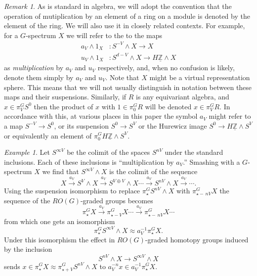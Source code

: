 \documentclass{amsart}
\newtheorem{rem}[equation]{Remark}
\theoremstyle{definition}
\theoremstyle{remark}
\newtheorem{rem}[equation]{Remark}
\newtheorem{eg}[equation]{Example}
\newcommand{\Z}{{\mathbb Z}}
\newcommand{\Zm}{\underline{\Z}}
\begin{document}
\begin{rem}
\label{rem:61} As is standard in algebra, we will adopt the convention
that the operation of mutiplication by an element of a ring on a
module is denoted by the element of the ring.  We will also use it in
closely related contexts.  For example, for a $G$-spectrum $X$ we will
refer to the to the maps
\begin{align*}
a_{V}\wedge 1_{X} &: S^{-V}\wedge X\to X \\
u_{V}\wedge 1_{X} &: S^{d-V}\wedge X\to H\Zm\wedge X
\end{align*}
as {\em multiplication} by $a_{V}$ and $u_{V}$ respectively, and, when
no confusion is likely, denote them simply by $a_{V}$ and $u_{V}$.
Note that $X$ might be a virtual representation sphere.  This means
that we will not usually distinguish in notation between these maps
and their suspensions.  Similarly, if $R$ is any equivariant algebra,
and $x\in \pi^{G}_{V} S^{0}$ then the product of $x$ with
$1\in\pi^{G}_{0}R$ will be denoted $x\in\pi^{G}_{V}R$.  In accordance
with this, at various places in this paper the symbol $a_{V}$ might
refer to a map $S^{-V}\to S^{0}$, or its suspension $S^{0}\to S^{V}$
or the Hurewicz image $S^{0}\to H\Zm\wedge S^{V}$ or equivalently an
element of $\pi^{G}_{0}H\Zm\wedge S^{V}$.
\end{rem}


\begin{eg}
\label{eg:15} Let $S^{\infty V}$ be the colimit of the spaces $S^{n
V}$ under the standard inclusions.  Each of these inclusions is
``multiplication by $a_{V}$.''  Smashing with a $G$-spectrum $X$ we
find that $S^{\infty V}\wedge X$ is the colimit of the sequence
\[
X\xrightarrow{a_{V}}{} S^{V}\wedge X\xrightarrow{a_{V}} S^{V\oplus V}\wedge X
\cdots \xrightarrow{a_{V}}{} S^{ n V}\wedge X \xrightarrow{a_{V}}{}\cdots.
\]
Using the suspension isomorphism to replace
$\pi^{G}_{\star}S^{ n V}\wedge X$ with
$\pi^{G}_{\star-\, n V}X$ the sequence of the $RO(G)$-graded
groups becomes
\[
\pi^{G}_{\star}X\xrightarrow{a_{V}}{} 
\pi^{G}_{\star-V}X\cdots\xrightarrow{a_{V}}{}
\pi^{G}_{\star-\, n V}X\cdots
\]
from which one gets an isomorphism
\[
\pi^{G}_{\star}S^{\infty V}\wedge X \approx
a_{V}^{-1}\pi^{G}_{\star} X. 
\]
Under this isomorphism the effect in $RO(G)$-graded homotopy groups
induced by the inclusion
\[
S^{ n V}\wedge X \to S^{\infty V}\wedge X
\]
sends $x\in \pi^{G}_{\star} X \approx \pi^{G}_{\star+V}S^{ n
V}\wedge X$ to $a_{V}^{-n}x\in a_{V}^{-1}\pi^{G}_{\star}X$.
\end{eg}
\end{document}
